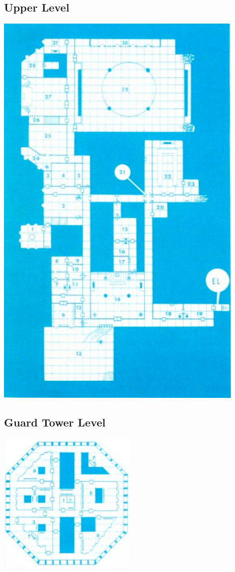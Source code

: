 \documentclass[palace_of_the_silver_princess]{subfiles}
\begin{document}
\begin{onecolumn}
\subsection{Upper Level}
\begin{center}
	\includegraphics[width=0.9\textwidth,height=0.9\textheight]{img/UL_map.png}
\end{center}
\clearpage

\subsection{Guard Tower Level}
\begin{center}
    \includegraphics[width=0.5\textwidth,height=0.5\textheight]{img/TL_map.png}
\end{center}
\clearpage

\end{onecolumn}
\end{document}
